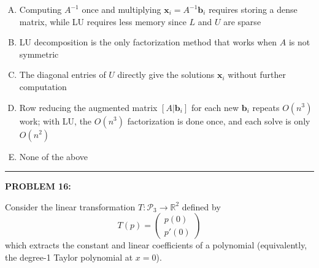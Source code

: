 \documentclass[12pt]{amsart}
\newcommand{\divider}{
  \vspace{-1em} %
  \noindent
  \raisebox{-0.15ex}{\textbullet}%
  \hspace{0.5em}%
  \rule[0.5ex]{0.95\textwidth}{1.0pt}%
  \hspace{0.5em}%
  \raisebox{-0.15ex}{\textbullet}%
  \vspace{0em} %
}
\begin{document}
\begin{enumerate}[(A)]
\item Computing $A^{-1}$ once and multiplying $\mathbf{x}_i = A^{-1}\mathbf{b}_i$ requires storing a dense matrix, while LU requires less memory since $L$ and $U$ are sparse
\item LU decomposition is the only factorization method that works when $A$ is not symmetric
\item The diagonal entries of $U$ directly give the solutions $\mathbf{x}_i$ without further computation
\item Row reducing the augmented matrix $[A | \mathbf{b}_i]$ for each new $\mathbf{b}_i$ repeats $O(n^3)$ work; with LU, the $O(n^3)$ factorization is done once, and each solve is only $O(n^2)$
\item None of the above
\end{enumerate}


\divider


\newpage


{\bf PROBLEM 16:}

Consider the linear transformation $T: \mathcal{P}_3 \to \mathbb{R}^2$ defined by
$$T(p) = \begin{pmatrix} p(0) \\ p'(0) \end{pmatrix}$$
which extracts the constant and linear coefficients of a polynomial (equivalently, the degree-1 Taylor polynomial at $x = 0$).
\end{document}
